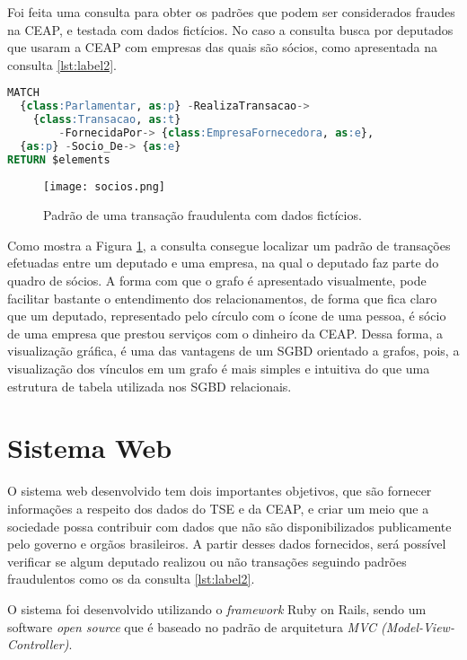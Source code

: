 Foi feita uma consulta para obter os padrões que podem ser considerados fraudes na CEAP, e testada com dados fictícios. No caso a consulta busca por deputados que usaram a CEAP com empresas das quais são sócios, como apresentada na consulta \ref{lst:label2}.

\begin{lstlisting}[label={lst:label2}, caption={Consulta de relacionamento de uso da CEAP entre deputados e empresas nas quais o deputado é sócio.},captionpos=b, language=sql]
MATCH 
  {class:Parlamentar, as:p} -RealizaTransacao-> 
  	{class:Transacao, as:t} 
    	-FornecidaPor-> {class:EmpresaFornecedora, as:e},
  {as:p} -Socio_De-> {as:e}
RETURN $elements
\end{lstlisting}

\begin{figure}[H]
\centering
\texttt{[image: socios.png]}
\caption{Padrão de uma transação fraudulenta com dados fictícios.}
\label{fig:socios}
\end{figure}

Como mostra a Figura \ref{fig:socios}, a consulta consegue localizar um padrão de transações efetuadas entre um deputado e uma empresa, na qual o deputado faz parte do quadro de sócios. A forma com que o grafo é apresentado visualmente, pode facilitar bastante o entendimento dos relacionamentos, de forma que fica claro que um deputado, representado pelo círculo com o ícone de uma pessoa, é sócio de uma empresa que prestou serviços com o dinheiro da CEAP. Dessa forma, a visualização gráfica, é uma das vantagens de um SGBD orientado a grafos, pois, a visualização dos vínculos em um grafo é mais simples e intuitiva do que uma estrutura de tabela utilizada nos SGBD relacionais.

\section{Sistema Web}

	O sistema web desenvolvido tem dois importantes objetivos, que são fornecer informações a respeito dos dados do TSE e da CEAP, e criar um meio que a sociedade possa contribuir com dados que não são disponibilizados publicamente pelo governo e orgãos brasileiros. A partir desses dados fornecidos, será possível verificar se algum deputado realizou ou não transações seguindo padrões fraudulentos como os da consulta \ref{lst:label2}.
	
	O sistema foi desenvolvido utilizando o \textit{framework} Ruby on Rails, sendo um software \textit{open source} que é baseado no padrão de arquitetura \textit{MVC (Model-View-Controller)}.

